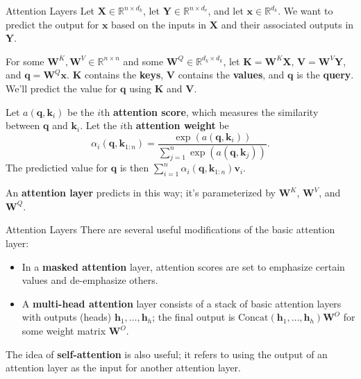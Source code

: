 \documentclass{beamer}
\begin{document}
\begin{frame}{Attention Layers}
    Let $\boldsymbol{X} \in \mathbb{R}^{n \times d_k}$, let $\boldsymbol{Y} \in \mathbb{R}^{n \times d_v}$, and let $\boldsymbol{x} \in \mathbb{R}^{d_k}$. We want to predict the output for $\boldsymbol{x}$ based on the inputs in $\boldsymbol{X}$ and their associated outputs in $\boldsymbol{Y}$.
    
    \medskip
    
    For some $\boldsymbol{W}^K, \boldsymbol{W}^V \in \mathbb{R}^{n \times n}$ and some $\boldsymbol{W}^Q \in \mathbb{R}^{d_k \times d_k}$, let $\boldsymbol{K} = \boldsymbol{W}^K \boldsymbol{X}$, $\boldsymbol{V} = \boldsymbol{W}^V \boldsymbol{Y}$, and $\boldsymbol{q} = \boldsymbol{W}^Q \boldsymbol{x}$. $\boldsymbol{K}$ contains the \textbf{keys}, $\boldsymbol{V}$ contains the \textbf{values}, and $\boldsymbol{q}$ is the \textbf{query}. We'll predict the value for $\boldsymbol{q}$ using $\boldsymbol{K}$ and $\boldsymbol{V}$.
    
    \medskip
    
    Let $a(\boldsymbol{q}, \boldsymbol{k}_i)$ be the $i$th \textbf{attention score}, which measures the similarity between $\boldsymbol{q}$ and $\boldsymbol{k}_i$. Let the $i$th \textbf{attention weight} be
    \[
    \alpha_i(\boldsymbol{q}, \boldsymbol{k}_{1:n}) = \frac{\exp(a(\boldsymbol{q}, \boldsymbol{k}_i))}{\sum_{j = 1}^n \exp(a(\boldsymbol{q}, \boldsymbol{k}_j))}.
    \]
    The predictied value for $\boldsymbol{q}$ is then $\sum_{i = 1}^n \alpha_i(\boldsymbol{q}, \boldsymbol{k}_{1:n}) \boldsymbol{v}_i$.
    
    \medskip

    An \textbf{attention layer} predicts in this way; it's parameterized by $\boldsymbol{W}^K$, $\boldsymbol{W}^V$, and $\boldsymbol{W}^Q$. 
\end{frame}

\begin{frame}{Attention Layers}
    There are several useful modifications of the basic attention layer:
    \begin{itemize}
        \item In a \textbf{masked attention} layer, attention scores are set to emphasize certain values and de-emphasize others.
        \item A \textbf{multi-head attention} layer consists of a stack of basic attention layers with outputs (heads) $\boldsymbol{h}_1, \ldots, \boldsymbol{h}_h$; the final output is
        $\text{Concat}(\boldsymbol{h}_1, \ldots, \boldsymbol{h}_h)\boldsymbol{W}^O$ for some weight matrix $\boldsymbol{W}^O$.
    \end{itemize}
    The idea of \textbf{self-attention} is also useful; it refers to using the output of an attention layer as the input for another attention layer.
\end{frame}
\end{document}
